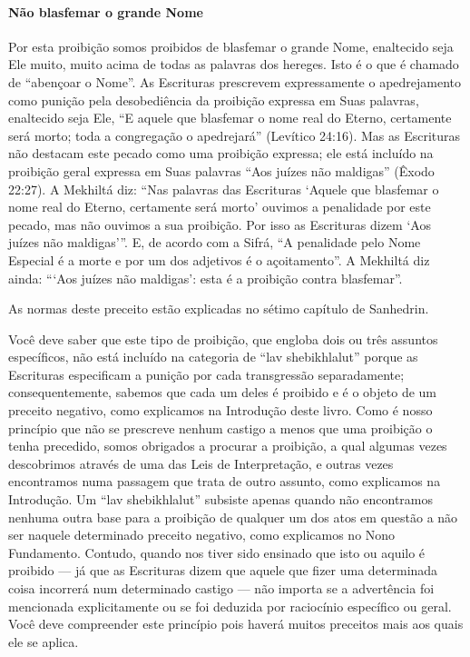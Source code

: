 \paragraph{Não blasfemar o grande Nome}

Por esta proibição somos proibidos de blasfemar o grande Nome,
enaltecido seja Ele muito, muito acima de todas as palavras dos hereges.
Isto é o que é chamado de ``abençoar o Nome''. As Escrituras prescrevem
expressamente o apedrejamento como punição pela desobediência da
proibição expressa em Suas palavras, enaltecido seja Ele, ``E aquele que
blasfemar o nome real do Eterno, certamente será morto; toda a
congregação o apedrejará'' (Levítico 24:16). Mas as Escrituras não
destacam este pecado como uma proibição expressa; ele está incluído na proibição geral expressa em Suas palavras
``Aos juízes não maldigas'' (Êxodo 22:27). A Mekhiltá diz: ``Nas
palavras das Escrituras `Aquele que blasfemar o nome real do Eterno,
certamente será morto' ouvimos a penalidade por este pecado, mas não
ouvimos a sua proibição. Por isso as Escrituras dizem `Aos juízes não
maldigas'''. E, de acordo com a Sifrá, ``A penalidade pelo Nome Especial
é a morte e por um dos adjetivos é o açoitamento''. A Mekhiltá diz
ainda: ```Aos juízes não maldigas': esta é a proibição contra
blasfemar''.

As normas deste preceito estão explicadas no sétimo capítulo de Sanhedrin.

Você deve saber que este tipo de proibição, que engloba dois ou três
assuntos específicos, não está incluído na categoria de ``lav
shebikhlalut'' porque as Escrituras especificam a punição por cada
transgressão separadamente; consequentemente, sabemos que cada um deles
é proibido e é o objeto de um preceito negativo, como explicamos na
Introdução deste livro. Como é nosso princípio que não se prescreve
nenhum castigo a menos que uma proibição o tenha precedido, somos
obrigados a procurar a proibição, a qual algumas vezes descobrimos
através de uma das Leis de Interpretação, e outras vezes encontramos
numa passagem que trata de outro assunto, como explicamos na
Introdução. Um ``lav shebikhlalut'' subsiste apenas quando não
encontramos nenhuma outra base para a proibição de qualquer um dos atos
em questão a não ser naquele determinado preceito negativo, como
explicamos no Nono Fundamento. Contudo, quando nos tiver sido ensinado
que isto ou aquilo é proibido --- já que as Escrituras dizem que aquele
que fizer uma determinada coisa incorrerá num determinado castigo ---
não importa se a advertência foi mencionada explicitamente ou se foi
deduzida por raciocínio específico ou geral. Você deve compreender este
princípio pois haverá muitos preceitos mais aos quais ele se aplica.

